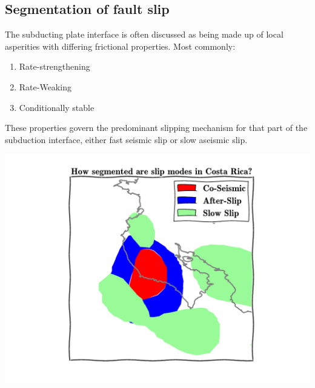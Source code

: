 \documentclass[a0,landscape]{a0poster}
\begin{document}
\vspace{1cm} %

\hrulefill
\begin{multicols}{5} %

\color{SaddleBrown} %

\section*{Segmentation of fault slip}



\color{DarkSlateGray} %

The subducting plate interface is often discussed as being made up of local asperities with differing frictional properties. Most commonly:
\begin{enumerate}
	\item Rate-strengthening
	\item Rate-Weaking
	\item Conditionally stable 
\end{enumerate}
These properties govern the predominant slipping mechanism for that part of the subduction interface, either fast seismic slip or slow aseismic slip. 
\begin{center}\vspace{0.3cm}
	\includegraphics[width=0.7\linewidth]{slip_seg.pdf}
\end{center}\vspace{0.3cm}


\end{multicols}
\end{document}

